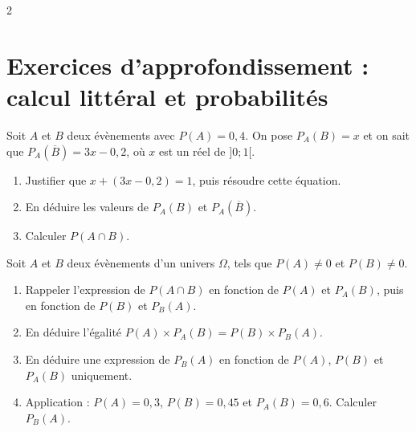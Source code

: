 \documentclass[10pt,a4paper]{article}
\begin{document}
\begin{multicols}{2}

\section{Exercices d'approfondissement : calcul littéral et probabilités}

\begin{exo}[][appro]
Soit \(A\) et \(B\) deux évènements avec \(P(A)=0,4\). On pose \(P_A(B)=x\) et on sait que \(P_A(\overline B)=3x-0,2\), où \(x\) est un réel de \(]0;1[\).

\begin{enumerate}[leftmargin=*]
    \item Justifier que \(x+(3x-0,2)=1\), puis résoudre cette équation.
    \item En déduire les valeurs de \(P_A(B)\) et \(P_A(\overline B)\).
    \item Calculer \(P(A\cap B)\).
\end{enumerate}
\end{exo}



\begin{exo}
Soit \(A\) et \(B\) deux évènements d'un univers \(\Omega\), tels que \(P(A)\neq0\) et \(P(B)\neq0\).

\begin{enumerate}[leftmargin=*]
    \item Rappeler l'expression de \(P(A\cap B)\) en fonction de \(P(A)\) et \(P_A(B)\), puis en fonction de \(P(B)\) et \(P_B(A)\).
    \item En déduire l'égalité \(P(A)\times P_A(B) = P(B)\times P_B(A)\).
    \item En déduire une expression de \(P_B(A)\) en fonction de \(P(A)\), \(P(B)\) et \(P_A(B)\) uniquement.
    \item Application : \(P(A)=0,3\), \(P(B)=0,45\) et \(P_A(B)=0,6\). Calculer \(P_B(A)\).
\end{enumerate}
\end{exo}


\end{multicols}
\end{document}
